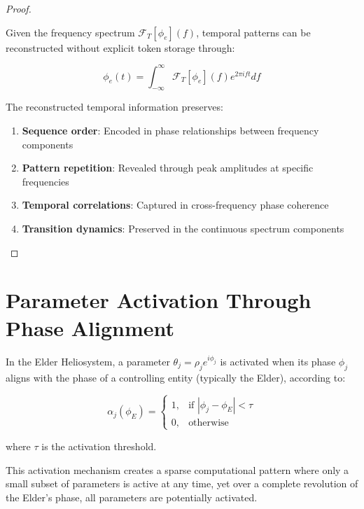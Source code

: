 \begin{proof}
\begin{lemma}
Given the frequency spectrum $\mathcal{F}_T[\phi_e](f)$, temporal patterns can be reconstructed without explicit token storage through:

\begin{equation}
\phi_e(t) = \int_{-\infty}^{\infty} \mathcal{F}_T[\phi_e](f) e^{2\pi i f t} df
\end{equation}

The reconstructed temporal information preserves:
\begin{enumerate}
    \item \textbf{Sequence order}: Encoded in phase relationships between frequency components
    \item \textbf{Pattern repetition}: Revealed through peak amplitudes at specific frequencies
    \item \textbf{Temporal correlations}: Captured in cross-frequency phase coherence
    \item \textbf{Transition dynamics}: Preserved in the continuous spectrum components
\end{enumerate}
\end{lemma}
\end{proof}

\section{Parameter Activation Through Phase Alignment}

\begin{definition}
In the Elder Heliosystem, a parameter $\theta_j = \rho_j e^{i\phi_j}$ is activated when its phase $\phi_j$ aligns with the phase of a controlling entity (typically the Elder), according to:

\begin{equation}
\alpha_j(\phi_E) = 
\begin{cases}
1, & \text{if } |\phi_j - \phi_E| < \tau \\
0, & \text{otherwise}
\end{cases}
\end{equation}

where $\tau$ is the activation threshold.
\end{definition}

This activation mechanism creates a sparse computational pattern where only a small subset of parameters is active at any time, yet over a complete revolution of the Elder's phase, all parameters are potentially activated.

